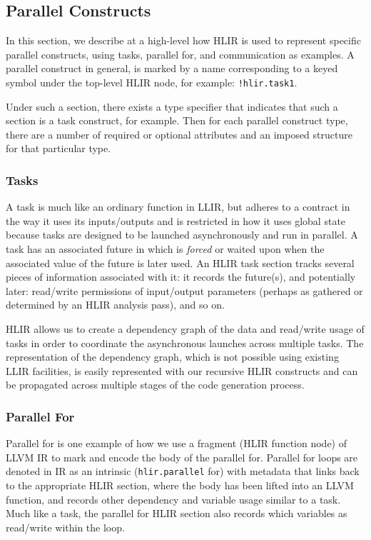 \documentclass[12pt]{article}
\begin{document}
\subsection{Parallel Constructs}

In this section, we describe at a high-level how HLIR is used to represent specific parallel constructs, using tasks, parallel for, and communication as examples. A parallel construct in general, is marked by a name corresponding to a keyed symbol under the top-level HLIR node, for example: {\tt !hlir.task1}. 

Under such a section, there exists a type specifier that indicates that such a section is a task construct, for example. Then for each parallel construct type, there are a number of required or optional attributes and an imposed structure for that particular type.

\subsubsection{Tasks}

A task is much like an ordinary function in LLIR, but adheres to a contract in the way it uses its inputs/outputs and is restricted in how it uses global state because tasks are designed to be launched asynchronously and run in parallel. A task has an associated future in which is {\it forced} or waited upon when the associated value of the future is later used. An HLIR task section tracks several pieces of information associated with it: it records the future(s), and potentially later: read/write permissions of input/output parameters (perhaps as gathered or determined by an HLIR analysis pass), and so on.

HLIR allows us to create a dependency graph of the data and read/write usage of tasks in order to coordinate the asynchronous launches across multiple tasks. The representation of the dependency graph, which is not possible using existing LLIR facilities, is easily represented with our recursive HLIR constructs and can be propagated across multiple stages of the code generation process.

\subsubsection{Parallel For}

Parallel for is one example of how we use a fragment (HLIR function node) of LLVM IR to mark and encode the body of the parallel for. Parallel for loops are denoted in IR as an intrinsic ({\tt hlir.parallel} for) with metadata that links back to the appropriate HLIR section, where the body has been lifted into an LLVM function, and records other dependency and variable usage similar to a task. Much like a task, the parallel for HLIR section also records which variables as read/write within the loop.
\end{document}
